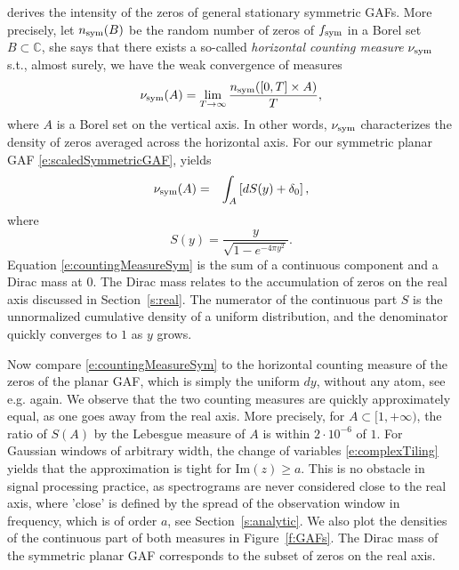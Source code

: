\cite{Fel13} derives the intensity of the zeros of general stationary
symmetric GAFs. More precisely, let $n_{\text{sym}}(B)$ be the random number of zeros
of $f_{\text{sym}}$ in a Borel set $B\subset\mathbb{C}$, she says that there exists a
so-called \emph{horizontal counting measure} $\nu_{\text{sym}}$ s.t., almost surely, we have the weak convergence of measures
$$
\nu_{\text{sym}}(A) = \lim_{T\rightarrow\infty}\frac{n_{\text{sym}}([0,T]\times A)}{T},
$$
where $A$ is a Borel set on the vertical axis. In other
words, $\nu_{\text{sym}}$ characterizes the density of zeros averaged across the
horizontal axis. For our symmetric planar GAF \eqref{e:scaledSymmetricGAF},
\cite[Theorem 1]{Fel13} yields
\begin{eqnarray}
\nu_{\text{sym}}(A) &=& \int_{A} \left[ dS(y) + \delta_0\right],
\label{e:countingMeasureSym}
\end{eqnarray}
where
$$
S(y)  = \frac{y}{\sqrt{1-e^{-4\pi y^2}}}.
$$
Equation \eqref{e:countingMeasureSym} is the sum of a continuous component and a
Dirac mass at $0$. The Dirac mass relates to the accumulation of zeros on the
real axis discussed in Section~\ref{s:real}. The numerator of the continuous
part $S$ is the unnormalized cumulative density of a uniform distribution, and the
denominator quickly converges to $1$ as $y$ grows. 

Now compare \eqref{e:countingMeasureSym} to the horizontal
counting measure of the zeros of the planar GAF, which is simply the uniform
$dy$, without any atom, see e.g. \cite[Theorem 1]{Fel13} again. We observe that the two counting
measures are quickly approximately equal, as one goes away from the real axis.
More precisely, for $A\subset [1,+\infty)$, the ratio of $S(A)$ by the Lebesgue
measure of $A$ is within $2\cdot 10^{-6}$ of $1$. For Gaussian windows of
arbitrary width, the change of variables \eqref{e:complexTiling} yields that
the approximation is tight for $\text{Im}(z)\geq a$. This is no obstacle in
signal processing practice, as spectrograms are never considered close to the
real axis, where 'close' is defined by the spread of the observation window in
frequency, which is of order $a$, see Section~\ref{s:analytic}. We also plot the
densities of the continuous part of both measures in Figure~\ref{f:GAFs}. The
Dirac mass of the symmetric planar GAF corresponds to the subset of zeros on the
real axis. 

